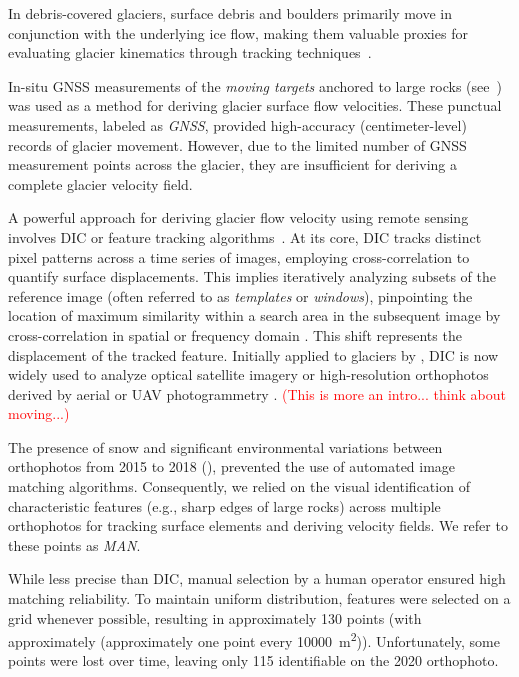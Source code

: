 In debris-covered glaciers, surface debris and boulders primarily move in conjunction with the underlying
ice flow, making them valuable proxies for evaluating glacier kinematics through tracking 
techniques~\citep{Dehecq2015, Sam2016, Blothe2021}.

In-situ GNSS measurements of the \textit{moving targets} anchored to large rocks (see~)
was used as a method for deriving glacier surface flow velocities.
These punctual measurements, labeled as \textit{GNSS}, provided high-accuracy (centimeter-level) records of glacier movement.
However, due to the limited number of GNSS measurement points across the glacier, they are insufficient for deriving a 
complete glacier velocity field.

A powerful approach for deriving glacier flow velocity using remote sensing involves DIC or 
feature tracking algorithms~\citep{ahn_box_2010, Giordan2016, Hadhri2019}.
At its core, DIC tracks distinct pixel patterns across a time series of images, employing cross-correlation to quantify 
surface displacements. 
This implies iteratively analyzing subsets of the reference image (often referred to as \textit{templates} 
or \textit{windows}), pinpointing the location of maximum similarity within a search area in the subsequent 
image by cross-correlation in spatial \citep{Scambos1992} or frequency domain \citep{rolstad1997}.
This shift represents the displacement of the tracked feature.
Initially applied to glaciers by \cite{Scambos1992}, DIC is now widely used to analyze optical satellite imagery
\citep{Scambos1992, Scherler2008, Heid2012_evaluation_xcorr} or high-resolution orthophotos derived by aerial or 
UAV photogrammetry \citep{immerzeel2014, Chudley2019, ioli2021mid}. \textcolor{red}{(This is more an intro... think about moving...)}

The presence of snow and significant environmental variations between orthophotos from 2015 to 2018 (),
prevented the use of automated image matching algorithms. 
Consequently, we relied on the visual identification of characteristic features (e.g., sharp edges of large rocks) across multiple 
orthophotos \citep{Lucchitta1986} for tracking surface elements and deriving velocity fields. 
We refer to these points as \textit{MAN}.

While less precise than DIC, manual selection by a human operator ensured high matching reliability. 
To maintain uniform distribution, features were selected on a  grid whenever possible, resulting 
in approximately 130 points (with approximately (approximately one point every \qty{10000}{\meter\squared})).  
Unfortunately, some points were lost over time, leaving only 115 identifiable on the 2020 orthophoto.

